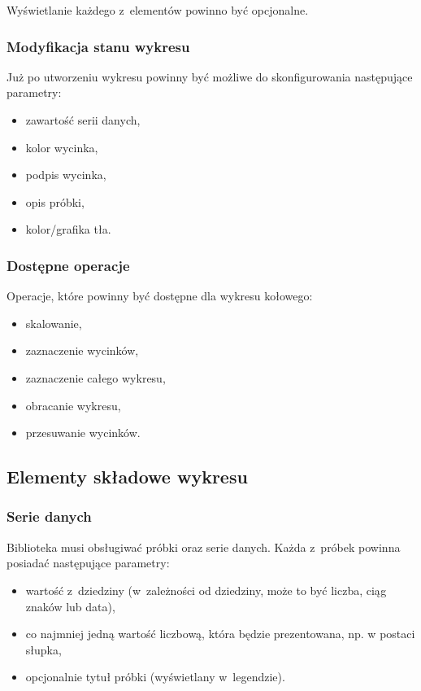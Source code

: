 \documentclass[11pt,twoside,a4paper,final]{article}
\begin{document}
Wyświetlanie każdego z~elementów powinno być opcjonalne. 

\subsubsection{Modyfikacja stanu wykresu}
Już po utworzeniu wykresu powinny być możliwe do skonfigurowania następujące parametry:
\begin{itemize}
\item{zawartość serii danych,}
\item{kolor wycinka,}
\item{podpis wycinka,}
\item{opis próbki,}
\item{kolor/grafika tła.}
\end{itemize}

\subsubsection{Dostępne operacje}
Operacje, które powinny być dostępne dla wykresu kołowego:
\begin{itemize}
\item{skalowanie,}
\item{zaznaczenie wycinków,}
\item{zaznaczenie całego wykresu,}
\item{obracanie wykresu,}
\item{przesuwanie wycinków.}
\end{itemize}

\subsection{Elementy składowe wykresu}
\subsubsection{Serie danych}
Biblioteka musi obsługiwać próbki oraz serie danych. Każda z~próbek powinna posiadać następujące parametry:
\begin{itemize}
\item{wartość z~dziedziny (w~zależności od dziedziny, może to być liczba, ciąg znaków lub data),}
\item{co najmniej jedną wartość liczbową, która będzie prezentowana, np. w postaci słupka,}
\item{opcjonalnie tytuł próbki (wyświetlany w~legendzie).}
\end{itemize}
\end{document}
